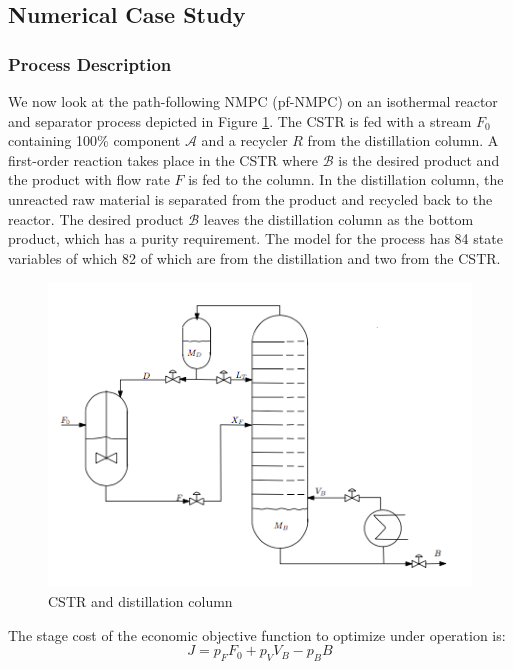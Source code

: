 \documentclass{article}
\theoremstyle{example}
\theoremstyle{definition}
\theoremstyle{assumption}
\theoremstyle{lemma}
\begin{document}
\subsection{Numerical Case Study}
\subsubsection{Process Description}
	We now look at the path-following NMPC (pf-NMPC) on an isothermal reactor and separator process depicted in Figure \ref{fig:reactor}.
The CSTR is fed with a stream $F_0$ containing 100\% component $\mathcal{A}$ and a recycler $R$ from the distillation column.
A first-order reaction  takes place in the CSTR where $\mathcal{B}$ is the desired product and the product with flow rate $F$ is fed to the column.
In the distillation column, the unreacted raw material is separated from the product and recycled back to the reactor.
The desired product $\mathcal{B}$ leaves the distillation column as the bottom product, which has a purity requirement.
The model for the process has 84 state variables of which 82 of which are from the distillation and two from the CSTR.
	\begin{figure}[H]
		\centering
		\includegraphics{reactor}
		\caption{CSTR and distillation column}
		\label{fig:reactor}
	\end{figure}
\par
The stage cost of the economic objective function to optimize under operation is:
\begin{equation}
	J=p_FF_0+p_VV_B-p_BB
\end{equation}
\end{document}
